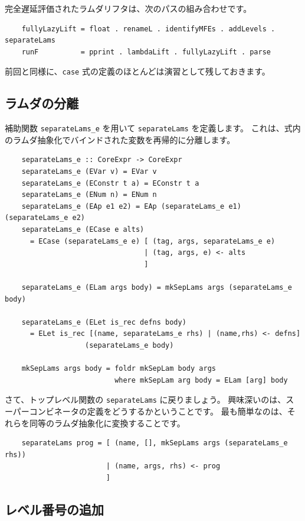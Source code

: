 \documentclass{jbook}
\begin{document}
完全遅延評価されたラムダリフタは、次のパスの組み合わせです。

\begin{verbatim}
	fullyLazyLift = float . renameL . identifyMFEs . addLevels . separateLams
	runF          = pprint . lambdaLift . fullyLazyLift . parse
\end{verbatim}

前回と同様に、\texttt{case} 式の定義のほとんどは演習として残しておきます。

\subsection{ラムダの分離}

補助関数 \texttt{separateLams\_e} を用いて \texttt{separateLams} を定義します。
これは、式内のラムダ抽象化でバインドされた変数を再帰的に分離します。

\begin{verbatim}
	separateLams_e :: CoreExpr -> CoreExpr
	separateLams_e (EVar v) = EVar v
	separateLams_e (EConstr t a) = EConstr t a
	separateLams_e (ENum n) = ENum n
	separateLams_e (EAp e1 e2) = EAp (separateLams_e e1) (separateLams_e e2)
	separateLams_e (ECase e alts)
	  = ECase (separateLams_e e) [ (tag, args, separateLams_e e)
	                             | (tag, args, e) <- alts
	                             ]

	separateLams_e (ELam args body) = mkSepLams args (separateLams_e body)

	separateLams_e (ELet is_rec defns body)
	  = ELet is_rec [(name, separateLams_e rhs) | (name,rhs) <- defns]
	               (separateLams_e body)

	mkSepLams args body = foldr mkSepLam body args
	                      where mkSepLam arg body = ELam [arg] body
\end{verbatim}

さて、トップレベル関数の \texttt{separateLams} に戻りましょう。
興味深いのは、スーパーコンビネータの定義をどうするかということです。
最も簡単なのは、それらを同等のラムダ抽象化に変換することです。

\begin{verbatim}
	separateLams prog = [ (name, [], mkSepLams args (separateLams_e rhs))
	                    | (name, args, rhs) <- prog
	                    ]
\end{verbatim}

\subsection{レベル番号の追加}
\end{document}
